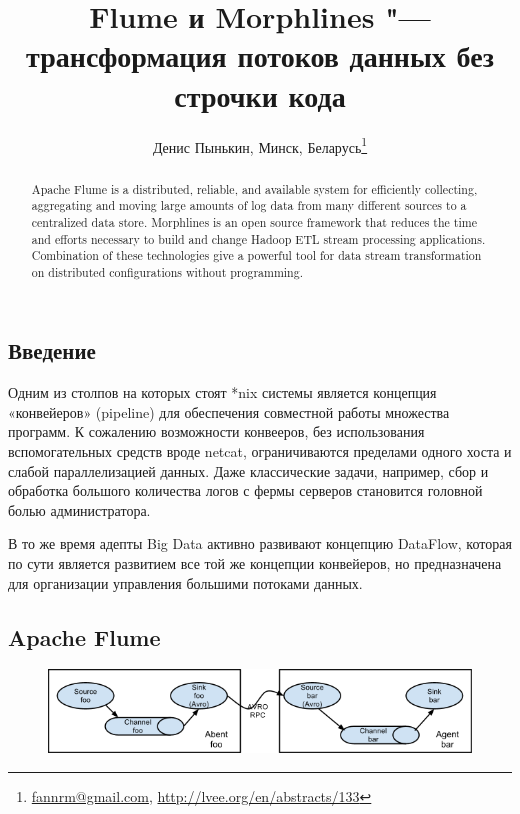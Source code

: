 \documentclass[10pt, a5paper]{article}
\begin{document}
\title{Flume и Morphlines "--- трансформация потоков данных без строчки кода}
\author{Денис Пынькин, Минск, Беларусь\footnote{\url{fannrm@gmail.com}, \url{http://lvee.org/en/abstracts/133}}}
\maketitle
\begin{abstract}
Apache Flume is a distributed, reliable, and available system for efficiently collecting, aggregating and moving large amounts of log data from many different sources to a centralized data store.
Morphlines is an open source framework that reduces the time and efforts necessary to build and change Hadoop ETL stream processing applications.
Combination of these technologies give a powerful tool for data stream transformation on distributed configurations without programming.
\end{abstract}
\subsection*{Введение}

Одним из столпов на которых стоят *nix системы является концепция «конвейеров» (pipeline) для обеспечения совместной работы множества программ. К сожалению возможности конвееров, без использования вспомогательных средств вроде netcat, ограничиваются пределами одного хоста и слабой параллелизацией данных. Даже классические задачи, например, сбор и обработка большого количества логов с фермы серверов становится головной болью администратора.

В то же время адепты Big Data активно развивают концепцию DataFlow, которая по сути является развитием все той же концепции конвейеров, но предназначена для организации управления большими потоками данных.

\subsection*{Apache Flume}

\begin{figure}[h!]
  \centering
  \includegraphics[scale=0.5]{21_2014_UserGuide_image03.png}
\end{figure}
\end{document}

